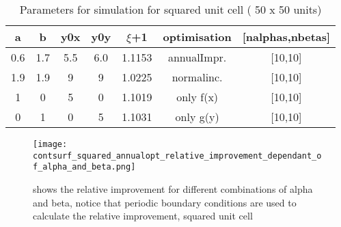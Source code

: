 \begin{table}
\centering
\caption{Parameters for simulation for squared unit cell ( 50 x 50 units) }
\label{_table_squared_cell}
\begin{tabular}{c|c|c|c|c|c|c}
a & b & y0x & y0y & $\xi$+1 & optimisation & [nalphas,nbetas] \\
\hline\hline
0.6 & 1.7 & 5.5 & 6.0 & 1.1153 & annualImpr. & [10,10] \\
1.9 & 1.9 & 9 & 9 & 1.0225 & normalinc. & [10,10] \\
1 & 0 & 5 & 0 & 1.1019 & only f(x) & [10,10] \\
0 & 1 & 0 & 5 & 1.1031 & only g(y) & [10,10]
\end{tabular}
\end{table}


\begin{figure}[h]
\centering
\texttt{[image: contsurf\_squared\_annualopt\_relative\_improvement\_dependant\_of\_alpha\_and\_beta.png]}
\caption{shows the relative improvement for different combinations of alpha and beta, notice that periodic boundary conditions are used to calculate the relative improvement, squared unit cell \label{contsurf_squared_annualopt_relative_improvement_dependant_of_alpha_and_beta}}
\end{figure}
